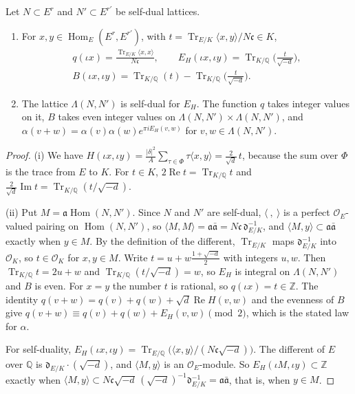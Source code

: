 \begin{lemma}\label{latticeF1}
Let $N\subset E^r$ and $N'\subset E^{r'}$ be self-dual lattices.
\begin{enumerate}
\item[(i)] For $x,y\in\operatorname{Hom}_E(E^r,E^{r'})$, with $t=\operatorname{Tr}_{E/K}\langle x,y\rangle/N\mathfrak c\in K$,
\begin{gather*}
q(\iota x)=\frac{\operatorname{Tr}_{E/K}\langle x,x\rangle}{N\mathfrak c},\qquad E_H(\iota x,\iota y)=\operatorname{Tr}_{K/\mathbb Q}\Big(\frac t{\sqrt{-d}}\Big),\\
B(\iota x,\iota y)=\operatorname{Tr}_{K/\mathbb Q}(t)-\operatorname{Tr}_{K/\mathbb Q}\Big(\frac t{\sqrt{-d}}\Big).
\end{gather*}
\item[(ii)] The lattice $\Lambda(N,N')$ is self-dual for $E_H$. The function $q$ takes integer values on it, $B$ takes even integer values on $\Lambda(N,N')\times\Lambda(N,N')$, and $\alpha(v+w)=\alpha(v)\alpha(w)e^{\pi iE_H(v,w)}$ for $v,w\in\Lambda(N,N')$.
\end{enumerate}
\end{lemma}

\begin{proof}
(i) We have $H(\iota x,\iota y)=\frac{\lvert\delta\rvert^2}A\sum_{\tau\in\Phi}\tau\langle x,y\rangle=\frac2{\sqrt d}\,t$, because the sum over $\Phi$ is the trace from $E$ to $K$. For $t\in K$, $2\operatorname{Re}t=\operatorname{Tr}_{K/\mathbb Q}t$ and $\frac2{\sqrt d}\operatorname{Im}t=\operatorname{Tr}_{K/\mathbb Q}(t/\sqrt{-d})$.

(ii) Put $M=\mathfrak a\operatorname{Hom}(N,N')$. Since $N$ and $N'$ are self-dual, $\langle\ ,\ \rangle$ is a perfect $\mathcal O_E$-valued pairing on $\operatorname{Hom}(N,N')$, so $\langle M,M\rangle=\mathfrak a\bar{\mathfrak a}=N\mathfrak c\,\mathfrak d_{E/K}^{-1}$, and $\langle M,y\rangle\subset\mathfrak a\bar{\mathfrak a}$ exactly when $y\in M$. By the definition of the different, $\operatorname{Tr}_{E/K}$ maps $\mathfrak d_{E/K}^{-1}$ into $\mathcal O_K$, so $t\in\mathcal O_K$ for $x,y\in M$. Write $t=u+w\frac{1+\sqrt{-d}}2$ with integers $u,w$. Then $\operatorname{Tr}_{K/\mathbb Q}t=2u+w$ and $\operatorname{Tr}_{K/\mathbb Q}(t/\sqrt{-d})=w$, so $E_H$ is integral on $\Lambda(N,N')$ and $B$ is even. For $x=y$ the number $t$ is rational, so $q(\iota x)=t\in\mathbb Z$. The identity $q(v+w)=q(v)+q(w)+\sqrt d\operatorname{Re}H(v,w)$ and the evenness of $B$ give $q(v+w)\equiv q(v)+q(w)+E_H(v,w)\pmod2$, which is the stated law for $\alpha$.

For self-duality, $E_H(\iota x,\iota y)=\operatorname{Tr}_{E/\mathbb Q}\big(\langle x,y\rangle/(N\mathfrak c\sqrt{-d})\big)$. The different of $E$ over $\mathbb Q$ is $\mathfrak d_{E/K}\cdot(\sqrt{-d})$, and $\langle M,y\rangle$ is an $\mathcal O_E$-module. So $E_H(\iota M,\iota y)\subset\mathbb Z$ exactly when $\langle M,y\rangle\subset N\mathfrak c\sqrt{-d}\,(\sqrt{-d})^{-1}\mathfrak d_{E/K}^{-1}=\mathfrak a\bar{\mathfrak a}$, that is, when $y\in M$.
\end{proof}

